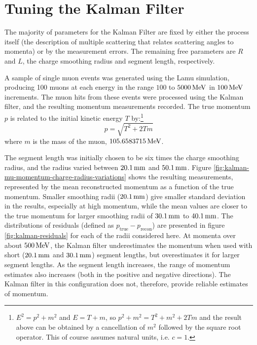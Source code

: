 \section{Tuning the Kalman Filter}\label{sec:kalman-tuning}
The majority of parameters for the Kalman Filter are fixed by either the process itself (the description of multiple scattering that relates scattering angles to momenta) or by the measurement errors. The remaining free parameters are $R$ and $L$, the charge smoothing radius and segment length, respectively.

A sample of single muon events was generated using the Lamu simulation, producing 100 muons at each energy in the range $100$ to $5000\,\mathrm{MeV}$ in $100\,\mathrm{MeV}$ increments. The muon hits from these events were processed using the Kalman filter, and the resulting momentum measurements recorded. The true momentum $p$ is related to the initial kinetic energy $T$ by:\footnote{$E^2 = p^2+m^2$ and $E = T + m$, so $p^2 + m^2 = T^2 + m^2 + 2 T m$ and the result above can be obtained by a cancellation of $m^2$ followed by the square root operator. This of course assumes natural units, i.e. $c=1$.}
\begin{equation}\label{eqn:momentum-kinetic-energy-relationship}
p = \sqrt{T^2 + 2 T m}
\end{equation}
where $m$ is the mass of the muon, $105.6583715\,\mathrm{MeV}$\citep{PDG2011}.

The segment length was initially chosen to be six times the charge smoothing radius, and the radius varied between $20.1\,\mathrm{mm}$ and $50.1\,\mathrm{mm}$. Figure \ref{fig:kalman-mu-momentum-charge-radius-variations} shows the resulting measurements, represented by the mean reconstructed momentum as a function of the true momentum. Smaller smoothing radii ($20.1\,\mathrm{mm}$) give smaller standard deviation in the results, especially at high momentum, while the mean values are closer to the true momentum for larger smoothing radii of $30.1\,\mathrm{mm}$ to $40.1\,\mathrm{mm}$. The distributions of residuals (defined as $p_{\mathrm{true}} - p_{\mathrm{recon}}$) are presented in figure \ref{fig:kalman-residuals} for each of the radii considered here. At momenta over about $500\,\mathrm{MeV}$, the Kalman filter underestimates the momentum when used with short ($20.1\,\mathrm{mm}$ and $30.1\,\mathrm{mm}$) segment lengths, but overestimates it for larger segment lengths. As the segment length increases, the range of momentum estimates also increases (both in the positive and negative directions). The Kalman filter in this configuration does not, therefore, provide reliable estimates of momentum.

